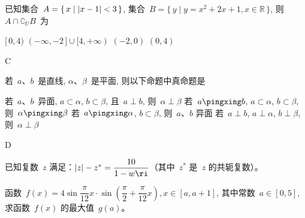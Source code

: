 \documentclass[printbox]{BHCexam}
\begin{document}
\begin{questions}
\question 已知集合~$A=\left\{\,x\mid \left|x-1\right|<3\,\right\}$,
集合~$B=\{\,y\mid y=x^2+2x+1,x\in\mathbb{R}\,\}$, 则~$A\cap
\complement_U B$~为
\begin{choices}
\choice $[\,0,4)$
\choice $(-\infty,-2\,]\cup[4,+\infty)$
\choice $(-2,0)$
\choice $(0,4)$
\end{choices}
\begin{solution}
C
\end{solution}

\question 若~$a$、$b$~是直线, $\alpha$、$\beta$~是平面,
则以下命题中真命题是 
\begin{choices}
\choice 若~$a$、$b$~异面, $a\subset\alpha$,
$b\subset\beta$, 且~$a\perp b$, 则~$\alpha\perp\beta$
\choice 若~$a\pingxing b$, $a\subset\alpha$, $b\subset\beta$,
则~$\alpha\pingxing\beta$
\choice 若~$a\pingxing \alpha$,
$b\subset\beta$, 则~$a$、$b$ 异面
\choice 若~$a\perp b$, $a\perp\alpha$,
$b\perp\beta$, 则~$\alpha\perp\beta$
\end{choices}
\begin{solution}
D
\end{solution}
\newpage
\jianda
\question 已知复数~$z$ 满足：$\abs{z}-z^*=\dfrac{10}{1-w\ri}$（其中~$z^*$
是~$z$ 的共轭复数）。

\begin{solution}
\end{solution}

\question[14] 函数~$f(x)=4\sin\dfrac{\pi}{12}x\cdot\sin
    \left(\dfrac{\pi}{2}+\dfrac{\pi}{12}x\right),x\in[a,a+1]$,
    其中常数~$a\in[0,5]$, 求函数~$f(x)$ 的最大值~$g(a)$。


\end{questions}
\end{document}
